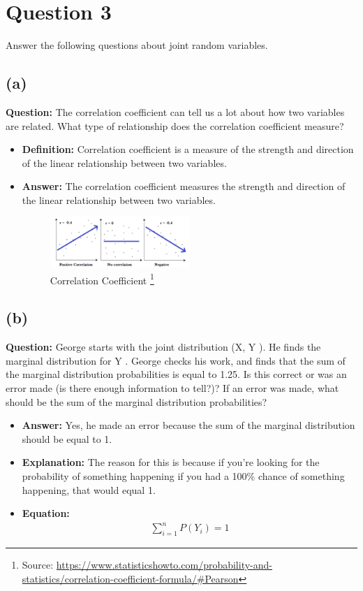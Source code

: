 \documentclass{article}
\begin{document}
\section*{Question 3}
Answer the following questions about joint random variables.
\subsection*{(a)}
\textbf{Question:} The correlation coefficient can tell us a lot about how two variables are related. What
type of relationship does the correlation coefficient measure?
\begin{itemize}
    \item[] \textbf{Definition:} Correlation coefficient is a measure of the strength and direction of the linear relationship between two variables.
    \item[] \textbf{Answer:} The correlation coefficient measures the strength and direction of the linear relationship between two variables.
\begin{figure}[h]
    \centering
    \includegraphics[width=0.5\textwidth]{Correlation Coefficient.png}
    \caption{Correlation Coefficient \protect\footnote{Source: \protect\url{https://www.statisticshowto.com/probability-and-statistics/correlation-coefficient-formula/\#Pearson}}}
    \label{fig:correlation}
\end{figure}
\end{itemize}
\subsection*{(b)} \textbf{Question:} George starts with the joint distribution (X, Y ). He finds the marginal distribution
for Y . George checks his work, and finds that the sum of the marginal distribution
probabilities is equal to 1.25. Is this correct or was an error made (is there enough
information to tell?)? If an error was made, what should be the sum of the marginal
distribution probabilities?
\begin{itemize}
    \item[] \textbf{Answer:} Yes, he made an error because the sum of the marginal distribution should be equal to 1. 
    \item[] \textbf{Explanation:} The reason for this is because if you're looking for the probability of something happening if you had a 100\% chance of something happening, that would equal 1.
    \item[] \textbf{Equation:}
    \begin{equation*}
        \begin{aligned}
        \sum_{i=1}^{n} P(Y_i) = 1
        \end{aligned}
    \end{equation*}
\end{itemize}
\newpage
\end{document}
